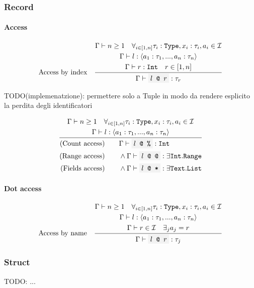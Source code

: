 \documentclass[11pt]{report}
\newcommand{\infrule}[3][gathered]{\frac{\begin{#1}#2\end{#1}}{\begin{gathered}#3\end{gathered}}}
\newcommand{\then}{\vdash}
\newcommand{\tuple}[1]{\left<#1\right>}
\newcommand{\code}[1]{\texttt{\colorbox{gray!10}{#1}}}
\newcommand{\Id}{\mathcal{I}}
\newcommand{\Type}{\texttt{Type}}
\newcommand{\Text}{\texttt{Text}}
\newcommand{\Int}{\texttt{Int}}
\newcommand{\List}{\texttt{List}}
\newcommand{\Range}{\texttt{Range}}
\newcommand{\Env}{\Gamma}
\theoremstyle{definition}
\newcommand{\comment}[1]{
	\parbox{0.9\linewidth}{\color{black!30}\small\sffamily #1}
}
\begin{document}
\subsubsection{Record}

\paragraph{Access}

\[
	\text{Access by index}\quad
	\infrule{
		\Env\then n \geq 1 \quad \forall_{i\in[1,n]}{\tau_i:\Type, x_i:\tau_i, a_i \in \Id} \\*
		\Env\then l:\tuple{a_1:\tau_1,...,a_n:\tau_n}\\*
		\Env\then r:\Int \quad r \in [1,n]
	}{
		\Env\then \code{$l$ @ $r$}: \tau_r
	}
\]

\comment{TODO(implemenatzione): permettere solo a Tuple in modo da rendere esplicito la perdita degli identificatori}

\[
	\infrule{
		\Env\then n \geq 1 \quad \forall_{i\in[1,n]}{\tau_i:\Type, x_i:\tau_i, a_i \in \Id} \\*
		\Env\then l:\tuple{a_1:\tau_1,...,a_n:\tau_n}\\*
	}{
		\begin{aligned}
			\text{(Count access)} \qquad & \Env\then \code{$l$ @ \%}: \Int                     \\*
			\text{(Range access)} \qquad & \land\Env\then \code{$l$ @ @}: \exists\Int.\Range\\*
			\text{(Fields access)} \qquad & \land\Env\then \code{$l$ @ *}: \exists\Text.\List
		\end{aligned}
	}
\]

\paragraph{Dot access}

\[
	\text{Access by name}\quad
	\infrule{
		\Env\then n \geq 1 \quad \forall_{i\in[1,n]}{\tau_i:\Type, x_i:\tau_i, a_i \in \Id} \\*
		\Env\then l:\tuple{a_1:\tau_1,...,a_n:\tau_n}\\*
		\Env\then r \in \Id \quad \exists_j a_j = r
	}{
		\Env\then \code{$l$ @ $r$}: \tau_j
	}
\]


\subsubsection{Struct}

\comment{TODO: ...}
\end{document}
